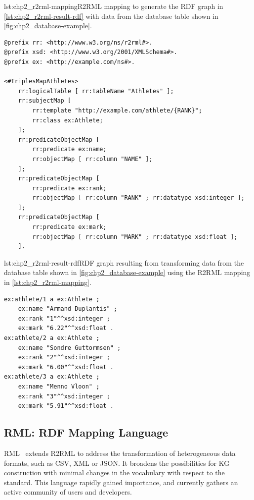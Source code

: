\begin{captionedlisting}{lst:chp2_r2rml-mapping}{R2RML mapping to generate the RDF graph in \cref{lst:chp2_r2rml-result-rdf} with data from the database table shown in \cref{fig:chp2_database-example}.}
\centering
{\begin{lstlisting}[language=r2rml]
@prefix rr: <http://www.w3.org/ns/r2rml#>.
@prefix xsd: <http://www.w3.org/2001/XMLSchema#>.
@prefix ex: <http://example.com/ns#>.

<#TriplesMapAthletes>
    rr:logicalTable [ rr:tableName "Athletes" ];
    rr:subjectMap [
        rr:template "http://example.com/athlete/{RANK}";
        rr:class ex:Athlete;
    ];
    rr:predicateObjectMap [
        rr:predicate ex:name;
        rr:objectMap [ rr:column "NAME" ];
    ];
    rr:predicateObjectMap [
        rr:predicate ex:rank;
        rr:objectMap [ rr:column "RANK" ; rr:datatype xsd:integer ];
    ];
    rr:predicateObjectMap [
        rr:predicate ex:mark;
        rr:objectMap [ rr:column "MARK" ; rr:datatype xsd:float ];
    ].
\end{lstlisting}}
\end{captionedlisting}

\begin{minipage}{\textwidth}
\begin{captionedlisting}{lst:chp2_r2rml-result-rdf}{RDF graph resulting from transforming data from the database table shown in \cref{fig:chp2_database-example} using the R2RML mapping in \cref{lst:chp2_r2rml-mapping}.}
\centering
\begin{multicols}{2}
{\begin{lstlisting}[language=r2rml]
ex:athlete/1 a ex:Athlete ;
    ex:name "Armand Duplantis" ;
    ex:rank "1"^^xsd:integer ;
    ex:mark "6.22"^^xsd:float .
ex:athlete/2 a ex:Athlete ;
    ex:name "Sondre Guttormsen" ;
    ex:rank "2"^^xsd:integer ;
    ex:mark "6.00"^^xsd:float .
ex:athlete/3 a ex:Athlete ;
    ex:name "Menno Vloon" ;
    ex:rank "3"^^xsd:integer ;
    ex:mark "5.91"^^xsd:float .
\end{lstlisting}}
\end{multicols}
\end{captionedlisting}
\end{minipage}



 
\subsection{RML: RDF Mapping Language}
\label{sec:chp2_RML}
RML~\parencite{Dimou2014rml} extends R2RML to address the transformation of heterogeneous data formats, such as CSV, XML or JSON. It broadens the possibilities for KG construction with minimal changes in the vocabulary with respect to the standard. This language rapidly gained importance, and currently gathers an active community of users and developers. 

